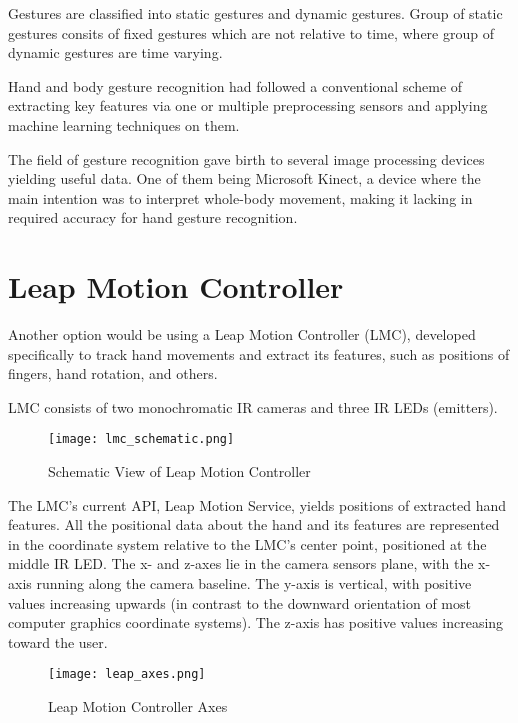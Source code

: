 
Gestures are classified into static gestures and dynamic gestures. Group of static gestures consits of fixed gestures which are not relative to time, where group of dynamic gestures are time varying.

Hand and body gesture recognition had followed a conventional scheme of extracting key features via one or multiple preprocessing sensors and applying machine learning techniques on them.\cite{avola}

The field of gesture recognition gave birth to several image processing devices yielding useful data. One of them being Microsoft Kinect, a device where the main intention was to interpret whole-body movement, making it lacking in required accuracy for hand gesture recognition. 

\section{Leap Motion Controller}

Another option would be using a Leap Motion Controller (LMC), developed specifically to track hand movements and extract its features, such as positions of fingers, hand rotation, and others.

LMC consists of two monochromatic IR cameras and three IR LEDs (emitters). 

\begin{figure}[h]
	\centering
    \texttt{[image: lmc\_schematic.png]}
	\caption{Schematic View of Leap Motion Controller}
	\label{fig:lmcScheme}
\end{figure}



The LMC's current API, Leap Motion Service, yields positions of extracted hand features. All the positional data about the hand and its features are represented in the coordinate system relative to the LMC's center point, positioned at the middle IR LED.\cite{LMCanalysis} The x- and z-axes lie in the camera sensors plane, with the x-axis running along the camera baseline. The y-axis is vertical, with positive values increasing upwards (in contrast to the downward orientation of most computer graphics coordinate systems). The z-axis has positive values increasing toward the user.\cite{tomasMultileap}

\begin{figure}[h]
	\centering
    \texttt{[image: leap\_axes.png]}
	\caption{Leap Motion Controller Axes}
	\label{fig:lmcScheme}
\end{figure}

